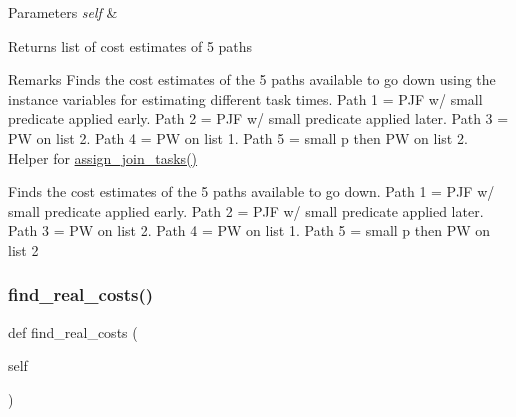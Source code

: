 \begin{DoxyParams}{Parameters}
{\em self} & \\
\hline
\end{DoxyParams}
\begin{DoxyReturn}{Returns}
list of cost estimates of 5 paths 
\end{DoxyReturn}
\begin{DoxyRemark}{Remarks}
Finds the cost estimates of the 5 paths available to go down using the instance variables for estimating different task times. Path 1 = P\+JF w/ small predicate applied early. Path 2 = P\+JF w/ small predicate applied later. Path 3 = PW on list 2. Path 4 = PW on list 1. Path 5 = small p then PW on list 2. Helper for \hyperlink{classdynamicfilterapp_1_1models_1_1_join_ad567a4773f2c57ad19df7e88ba5dc774}{assign\+\_\+join\+\_\+tasks()}\begin{DoxyVerb}Finds the cost estimates of the 5 paths available to go down. Path 1 = PJF w/ small predicate applied early. 
Path 2 = PJF w/ small predicate applied later. Path 3 = PW on list 2. Path 4 = PW on list 1. Path 5 = small p then PW on list 2\end{DoxyVerb}
 
\end{DoxyRemark}
\mbox{\label{classdynamicfilterapp_1_1models_1_1_join_adb5d30a19bc96815ec8f79b9ddefb1cf}} 
\subsubsection{\texorpdfstring{find\+\_\+real\+\_\+costs()}{find\_real\_costs()}}
{\footnotesize\ttfamily def find\+\_\+real\+\_\+costs (\begin{DoxyParamCaption}\item[{}]{self }\end{DoxyParamCaption})}


